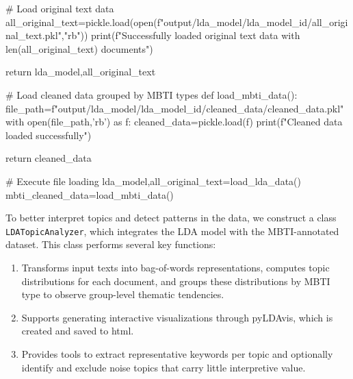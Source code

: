 \documentclass[12pt]{article}
\numberwithin{figure}{section}  %
\begin{document}
\begin{python}
    # Load original text data
    all_original_text=pickle.load(open(f"output/lda_model/lda_{model_id}/all_original_text.pkl","rb"))
    print(f"Successfully loaded original text data with {len(all_original_text)} documents")
    
    return lda_model,all_original_text
    

# Load cleaned data grouped by MBTI types
def load_mbti_data():
    file_path=f"output/lda_model/lda_{model_id}/cleaned_data/cleaned_data.pkl"
    with open(file_path,'rb') as f:
        cleaned_data=pickle.load(f)
    print(f"Cleaned data loaded successfully")

    return cleaned_data

# Execute file loading
lda_model,all_original_text=load_lda_data()
mbti_cleaned_data=load_mbti_data()
		\end{python}
	
	To better interpret topics and detect patterns in the data, we construct a
	class \texttt{LDATopicAnalyzer}, which integrates the LDA model with the
	MBTI-annotated dataset. This class performs several key functions: 
	\begin{enumerate}
		\item Transforms input texts into bag-of-words representations, computes
		topic distributions for each document, and groups these distributions by
		MBTI type to observe group-level thematic tendencies.
		\item Supports generating interactive visualizations through pyLDAvis, which
		is created and saved to html.
		\item Provides tools to extract representative keywords per topic and
		optionally identify and exclude noise topics that carry little interpretive
		value. 
	\end{enumerate}
	  
\end{document}
